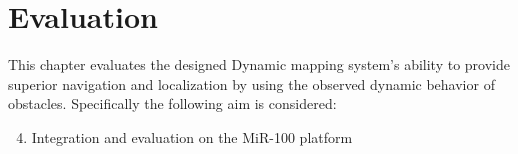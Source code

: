 \chapter{Evaluation}
\label{chapter:evaluation}
This chapter evaluates the designed Dynamic mapping system's ability to provide superior navigation and localization by using the observed dynamic behavior of obstacles.
Specifically the following aim is considered:

\begin{enumerate}
    \setcounter{enumi}{3}
    \item Integration and evaluation on the MiR-100 platform
\end{enumerate}










